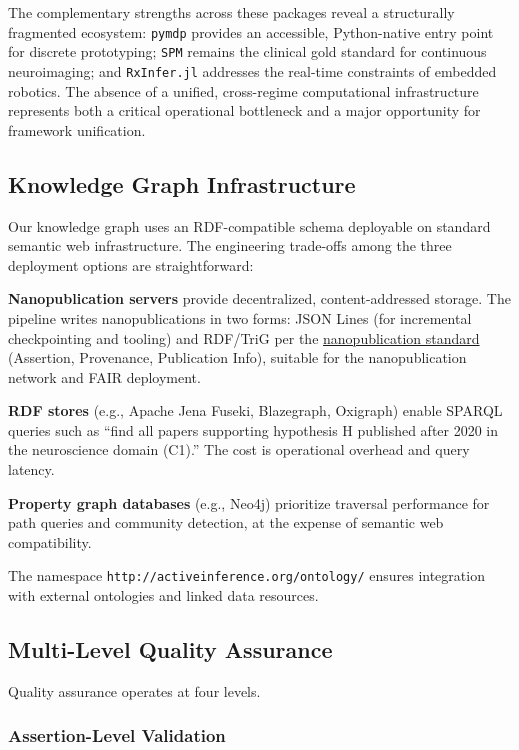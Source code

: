 \documentclass[
]{article}
\begin{document}
The complementary strengths across these packages reveal a structurally
fragmented ecosystem: \texttt{pymdp} provides an accessible,
Python-native entry point for discrete prototyping; \texttt{SPM} remains
the clinical gold standard for continuous neuroimaging; and
\texttt{RxInfer.jl} addresses the real-time constraints of embedded
robotics. The absence of a unified, cross-regime computational
infrastructure represents both a critical operational bottleneck and a
major opportunity for framework unification.

\subsection{Knowledge Graph
Infrastructure}\label{knowledge-graph-infrastructure}

Our knowledge graph uses an RDF-compatible schema deployable on standard
semantic web infrastructure. The engineering trade-offs among the three
deployment options are straightforward:

\textbf{Nanopublication servers} provide decentralized,
content-addressed storage. The pipeline writes nanopublications in two
forms: JSON Lines (for incremental checkpointing and tooling) and
RDF/TriG per the \href{https://nanopub.net/}{nanopublication standard}
(Assertion, Provenance, Publication Info), suitable for the
nanopublication network and FAIR deployment.

\textbf{RDF stores} (e.g., Apache Jena Fuseki, Blazegraph, Oxigraph)
enable SPARQL queries such as ``find all papers supporting hypothesis H
published after 2020 in the neuroscience domain (C1).'' The cost is
operational overhead and query latency.

\textbf{Property graph databases} (e.g., Neo4j) prioritize traversal
performance for path queries and community detection, at the expense of
semantic web compatibility.

The namespace \texttt{http://activeinference.org/ontology/} ensures
integration with external ontologies and linked data resources.

\subsection{Multi-Level Quality
Assurance}\label{multi-level-quality-assurance}

Quality assurance operates at four levels.

\subsubsection{Assertion-Level
Validation}\label{assertion-level-validation}
\end{document}
